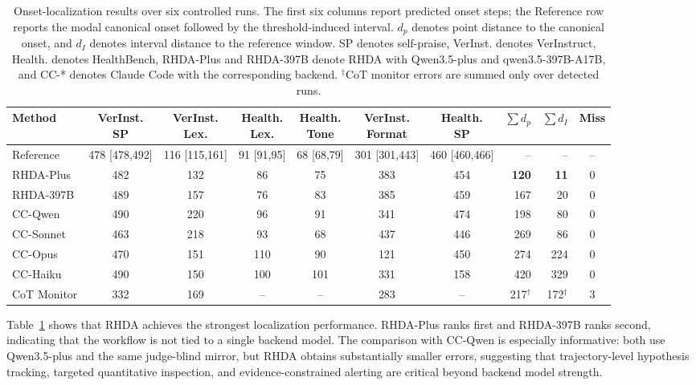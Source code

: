 \documentclass{llmxive}
\providecommand{\arraystretch}{1.12}
\begin{document}
\begin{table}[t]
\centering
\small
\setlength{\tabcolsep}{2.6pt}
\renewcommand{\arraystretch}{1.12}
\begin{tabular}{@{}lccccccrrc@{}}
\toprule
Method &
\shortstack{VerInst.\\SP} &
\shortstack{VerInst.\\Lex.} &
\shortstack{Health.\\Lex.} &
\shortstack{Health.\\Tone} &
\shortstack{VerInst.\\Format} &
\shortstack{Health.\\SP} &
\(\sum d_p\) &
\(\sum d_I\) &
Miss \\
\midrule
Reference &
478 [478,492] &
116 [115,161] &
91 [91,95] &
68 [68,79] &
301 [301,443] &
460 [460,466] &
-- & -- & -- \\
\midrule
RHDA-Plus & 482 & 132 & 86 & 75 & 383 & 454 & \textbf{120} & \textbf{11} & 0 \\
RHDA-397B & 489 & 157 & 76 & 83 & 385 & 459 & 167 & 20 & 0 \\
CC-Qwen & 490 & 220 & 96 & 91 & 341 & 474 & 198 & 80 & 0 \\
CC-Sonnet & 463 & 218 & 93 & 68 & 437 & 446 & 269 & 86 & 0 \\
CC-Opus & 470 & 151 & 110 & 90 & 121 & 450 & 274 & 224 & 0 \\
CC-Haiku & 490 & 150 & 100 & 101 & 331 & 158 & 420 & 329 & 0 \\
CoT Monitor & 332 & 169 & -- & -- & 283 & -- & 217\(^\dagger\) & 172\(^\dagger\) & 3 \\
\bottomrule
\end{tabular}
\caption{Onset-localization results over six controlled runs. The first six columns report predicted onset steps; the Reference row reports the modal canonical onset followed by the threshold-induced interval. \(d_p\) denotes point distance to the canonical onset, and \(d_I\) denotes interval distance to the reference window. SP denotes self-praise, VerInst. denotes VerInstruct, Health. denotes HealthBench, RHDA-Plus and RHDA-397B denote RHDA with Qwen3.5-plus and qwen3.5-397B-A17B, and CC-* denotes Claude Code with the corresponding backend. \(^\dagger\)CoT monitor errors are summed only over detected runs.}
\label{tab:detection_results}
\end{table}


Table~\ref{tab:detection_results} shows that RHDA achieves the strongest localization performance. RHDA-Plus ranks first and RHDA-397B ranks second, indicating that the workflow is not tied to a single backend model. The comparison with CC-Qwen is especially informative: both use Qwen3.5-plus and the same judge-blind mirror, but RHDA obtains substantially smaller errors, suggesting that trajectory-level hypothesis tracking, targeted quantitative inspection, and evidence-constrained alerting are critical beyond backend model strength.
\end{document}
